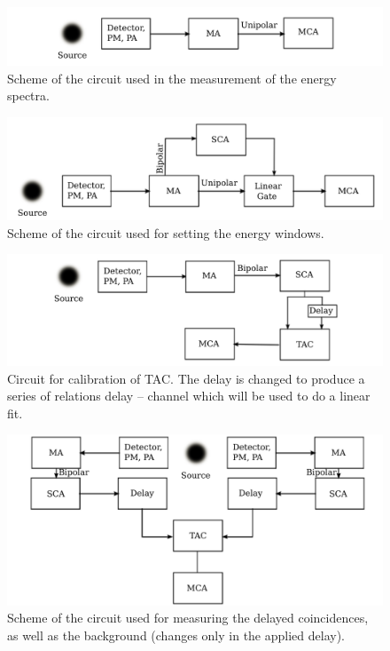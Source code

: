 \begin{figure}[H]
    \centering
    \includegraphics[width=\linewidth]{figures/circuit1.pdf}
    \caption{
        Scheme of the circuit used in the measurement of the energy spectra. 
        }
    \label{fig:circuit_spectrum}
\end{figure}

\begin{figure}[H]
    \centering
    \includegraphics[width=\linewidth]{figures/circuit2.pdf}
    \caption{
        Scheme of the circuit used for setting the energy windows. 
        }
    \label{fig:circuit_window}
\end{figure}

\begin{figure}[h]
    \centering
    \includegraphics[width=\linewidth]{figures/circuit3.pdf}
    \caption{
        Circuit for calibration of TAC. The delay is changed to produce a 
        series of relations delay -- channel which will be used to do a 
        linear fit. 
        }
    \label{fig:circuit_calibrate}
\end{figure}

\begin{figure}[h]
    \centering
    \includegraphics[width=\linewidth]{figures/circuit4.pdf}
    \caption{
        Scheme of the circuit used for measuring the delayed coincidences, 
        as well as the background (changes only in the applied delay). 
        }
    \label{fig:circuit_coincidences}
\end{figure}

